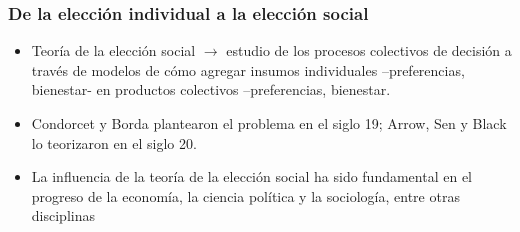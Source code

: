\documentclass[14pt,aspectratio=169]{beamer}
\begin{document}
\begin{frame}
\frametitle{De la elección individual a la elección social}
\begin{itemize}
\item Teoría de la elección social  $\longrightarrow$ estudio de los
  procesos colectivos de decisión a través de modelos de cómo agregar insumos individuales --preferencias, bienestar- en productos colectivos --preferencias, bienestar.
\item Condorcet y  Borda plantearon el
  problema en el siglo 19; Arrow, Sen y Black lo teorizaron en el
  siglo 20.
\item La influencia de la teoría de la elección social ha sido
  fundamental en el progreso de la economía, la ciencia política y la
  sociología, entre otras disciplinas
\end{itemize}
\end{frame}




\end{document}
